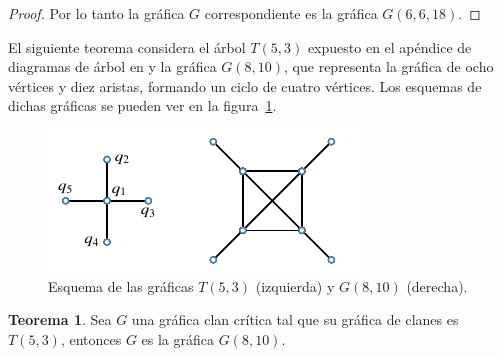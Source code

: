 \documentclass[12pt]{book}
\theoremstyle{definition}
\newtheorem{theorem}{Teorema}[chapter]
\begin{document}
\begin{proof}
Por lo tanto la gráfica $G$ correspondiente es la gráfica $G(6,6,18)$.
\end{proof}

El siguiente teorema considera el árbol $T(5,3)$ expuesto en el apéndice de diagramas de árbol en \cite{Harary:1969} y la gráfica $G(8,10)$, que representa la gráfica de ocho vértices y diez aristas, formando un ciclo de cuatro vértices. Los esquemas de dichas gráficas se pueden ver en la figura~\ref{F9}.

\begin{figure}[!htbp]
	\centering
	\includegraphics[scale=1.2]{Fig9.pdf}
	\caption{Esquema de las gráficas $T(5,3)$ (izquierda) y $G(8,10)$ (derecha).\label{F9}}
\end{figure}

\begin{theorem}
Sea $G$ una gráfica clan crítica tal que su gráfica de clanes es $T(5,3)$, entonces $G$ es la gráfica $G(8,10)$.
\end{theorem}
\end{document}
